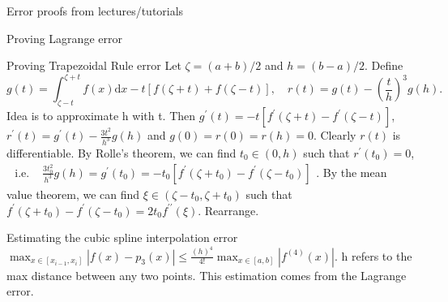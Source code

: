 \documentclass[10pt,landscape]{article}
\theoremstyle{definition}
\newcommand{\thistheoremname}{}
\newtheorem*{genericthm*}{\thistheoremname}
\newenvironment{namedthm*}[1]
{\renewcommand{\thistheoremname}{#1}\begin{genericthm*}}
{\end{genericthm*}}
\begin{document}
\begin{multicols}{3}
\begin{namedthm*}{Error proofs from lectures/tutorials}
\begin{namedthm*}{Proving Lagrange error}
		\end{namedthm*}
		\begin{namedthm*}{Proving Trapezoidal Rule error}
			Let \(\zeta=(a+b) / 2\) and \(h=(b-a) / 2 .\) Define
			\[
				g(t)=\int_{\zeta-t}^{\zeta+t} f(x) \mathrm{d} x-t[f(\zeta+t)+f(\zeta-t)], \quad r(t)=g(t)-\left(\frac{t}{h}\right)^{3} g(h).
			\] Idea is to approximate h with t. Then \(g^{\prime}(t)=-t\left[f^{\prime}(\zeta+t)-f^{\prime}(\zeta-t)\right]\), \(r^{\prime}(t)=g^{\prime}(t)-\frac{3 t^{2}}{h^{3}} g(h)\) and \(g(0)=r(0)=r(h)=0\). Clearly \(r(t)\) is differentiable. By Rolle's theorem, we can find \(t_{0} \in(0, h)\) such that \(r^{\prime}\left(t_{0}\right)=0\),
			\(\begin{array}{ll}{\text { i.e. }} & {\frac{3 t_{0}^{2}}{h^{3}} g(h)=g^{\prime}\left(t_{0}\right)=-t_{0}\left[f^{\prime}\left(\zeta+t_{0}\right)-f^{\prime}\left(\zeta-t_{0}\right)\right]}\end{array}\). By the mean value theorem, we can find \(\xi \in\left(\zeta-t_{0}, \zeta+t_{0}\right)\) such that
			\(			f^{\prime}\left(\zeta+t_{0}\right)-f^{\prime}\left(\zeta-t_{0}\right)=2 t_{0} f^{\prime \prime}(\xi)
			\). Rearrange.
		\end{namedthm*}

		\begin{namedthm*}{Estimating the cubic spline interpolation error}
			\(\max _{x \in\left[x_{i-1}, x_{i}\right]}\left|f(x)-p_{3}(x)\right| \leq \frac{(h)^{4}}{4 !} \max _{x \in[a, b]}\left|f^{(4)}(x)\right|\). h refers to the max distance between any two points. This estimation comes from the Lagrange error.
		\end{namedthm*}


\end{namedthm*}
\end{multicols}
\end{document}
